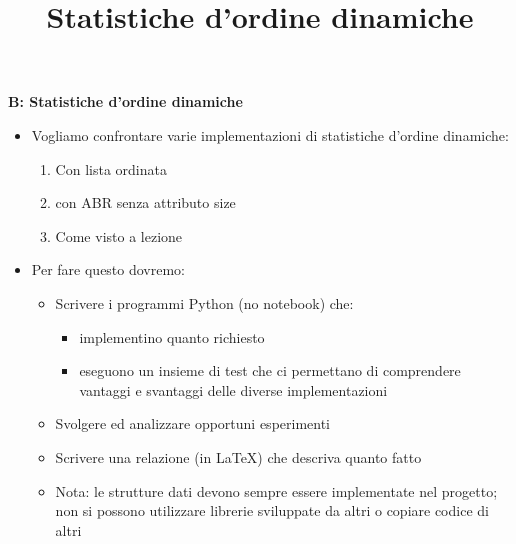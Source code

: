 \title{\fontsize{24}{28}\selectfont \textbf{Statistiche d'ordine dinamiche}}

\vspace{0.8cm}

\begin{tcolorbox}[colback=lightgray!20,colframe=black,arc=3mm, auto outer arc,]
                  
    \textbf{B: Statistiche d'ordine dinamiche}
    \begin{itemize}
    
    \item Vogliamo confrontare varie implementazioni di statistiche d’ordine dinamiche:
    
    \begin{enumerate}
        \item Con lista ordinata
        \item con ABR senza attributo size
        \item Come visto a lezione
    \end{enumerate}
    \item Per fare questo dovremo:
    
        \begin{itemize}
          
            \item Scrivere i programmi Python (no notebook) che:
          
            \begin{itemize}
            
                \item implementino quanto richiesto
                
                \item eseguono un insieme di test che ci permettano di comprendere vantaggi e svantaggi delle diverse implementazioni
                
            \end{itemize}
                
            \item Svolgere ed analizzare opportuni esperimenti

            \item Scrivere una relazione (in LaTeX) che descriva quanto fatto

            \item Nota: le strutture dati devono sempre essere implementate nel progetto; non si possono utilizzare librerie sviluppate da altri o copiare codice di altri

            
        \end{itemize}
        
    \end{itemize}
\end{tcolorbox}

